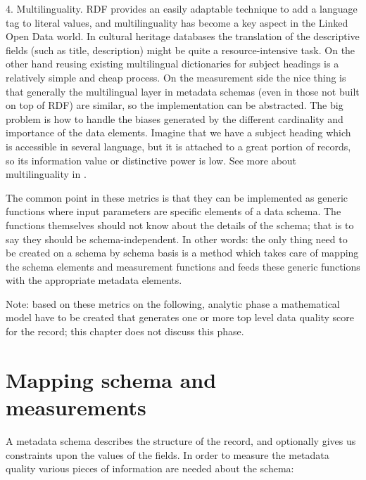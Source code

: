 4. Multilinguality. RDF provides an easily adaptable technique to add a language tag to literal values, and multilinguality has become a key aspect in the Linked Open Data world. In cultural heritage databases the translation of the descriptive fields (such as title, description) might be quite a resource-intensive task. On the other hand reusing existing multilingual dictionaries for subject headings is a relatively simple and cheap process. On the measurement side the nice thing is that generally the multilingual layer in metadata schemas (even in those not built on top of RDF) are similar, so the implementation can be abstracted. The big problem is how to handle the biases generated by the different cardinality and importance of the data elements. Imagine that we have a subject heading which is accessible in several language, but it is attached to a great portion of records, so its information value or distinctive power is low. See more about multilinguality in \cite{stiller-kiraly2017}.

The common point in these metrics is that they can be implemented as generic functions where input parameters are specific elements of a data schema. The functions themselves should not know about the details of the schema; that is to say they should be schema-independent. In other words: the only thing need to be created on a schema by schema basis is a method which takes care of mapping the schema elements and measurement functions and feeds these generic functions with the appropriate metadata elements.

Note: based on these metrics on the following, analytic phase a mathematical model have to be created that generates one or more top level data quality score for the record; this chapter does not discuss this phase.

\section{Mapping schema and measurements}

A metadata schema describes the structure of the record, and optionally gives us constraints upon the values of the fields. In order to measure the metadata quality various pieces of information are needed about the schema:

